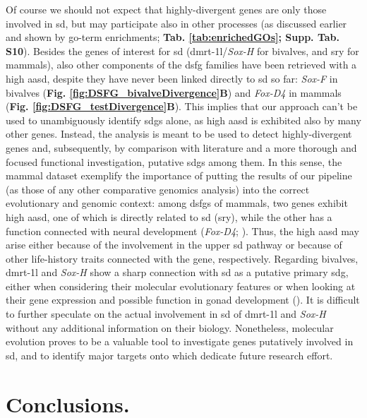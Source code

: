 \documentclass[../main.tex]{subfiles}
\begin{document}
Of course we should not expect that highly-divergent genes are only those involved in \gls{sd}, but may participate also in other processes (as discussed earlier and shown by \gls{go}-term enrichments; \textbf{Tab. \ref{tab:enrichedGOs}; Supp. Tab. S10}). Besides the genes of interest for \gls{sd} (\gls{dmrt-1l}/\textit{Sox-H} for bivalves, and \gls{sry} for mammals), also other components of the \gls{dsfg} families have been retrieved with a high \gls{aasd}, despite they have never been linked directly to \gls{sd} so far: \textit{Sox-F} in bivalves (\textbf{Fig. \ref{fig:DSFG_bivalveDivergence}B}) and \textit{Fox-D4} in mammals (\textbf{Fig. \ref{fig:DSFG_testDivergence}B}). This implies that our approach can't be used to unambiguously identify \glspl{sdg} alone, as high \gls{aasd} is exhibited also by many other genes. Instead, the analysis is meant to be used to detect highly-divergent genes and, subsequently, by comparison with literature and a more thorough and focused functional investigation, putative \glspl{sdg} among them. In this sense, the mammal dataset exemplify the importance of putting the results of our pipeline (as those of any other comparative genomics analysis) into the correct evolutionary and genomic context: among \glspl{dsfg} of mammals, two genes exhibit high \gls{aasd}, one of which is directly related to \gls{sd} (\gls{sry}), while the other has a function connected with neural development (\textit{Fox-D4}; \textbf{\cite{klein2013conserved}}). Thus, the high \gls{aasd} may arise either because of the involvement in the upper \gls{sd} pathway or because of other life-history traits connected with the gene, respectively. Regarding bivalves, \gls{dmrt-1l} and \textit{Sox-H} show a sharp connection with \gls{sd} as a putative primary \gls{sdg}, either when considering their molecular evolutionary features or when looking at their gene expression and possible function in gonad development (\textbf{\cite{naimi2009molecular, teaniniuraitemoana2014gonad, zhang2014genomic, capt2018deciphering, li2018foxl2, afonso2019gonad, liang2019sox2, yue2021variance}}). It is difficult to further speculate on the actual involvement in \gls{sd} of \gls{dmrt-1l} and \textit{Sox-H} without any additional information on their biology. Nonetheless, molecular evolution proves to be a valuable tool to investigate genes putatively involved in \gls{sd}, and to identify major targets onto which dedicate future research effort.

\section{Conclusions.} \label{chapter3_conclusions}
\end{document}
